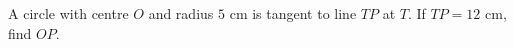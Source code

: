 A circle with centre $O$ and radius $5$ cm is tangent to line $TP$ at $T$. If $TP=12$ cm, find $OP$.
